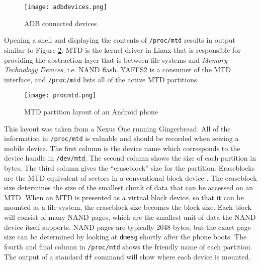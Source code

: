 \begin{figure}[htb]
\caption{ADB connected devices}
\begin{center}\texttt{[image: adbdevices.png]}\end{center}
\label{fig:adbdevices}
\end{figure}

Opening a shell and displaying the contents of \texttt{/proc/mtd} results in output similar to Figure \ref{fig:mtd}.  MTD is the
kernel driver in Linux that is responsible for providing the abstraction layer that is between file systems and \emph{Memory
Technology Devices}, i.e. NAND flash. YAFFS2 is a consumer of the MTD interface, and \texttt{/proc/mtd} lists all of the active MTD
partitions. 

\begin{figure}[htb]
\caption{MTD partition layout of an Android phone}
\begin{center}\texttt{[image: procmtd.png]}\end{center}
\label{fig:mtd}
\end{figure}	

This layout was taken from a Nexus One running Gingerbread.  All of the information in \texttt{/proc/mtd} is valuable and should be
recorded when seizing a mobile device. The first column is the device name which corresponds to the device handle in
\texttt{/dev/mtd}.  The second column shows the size of each partition in bytes. 
The third column gives the ``eraseblock'' size for the partition.  Eraseblocks are the MTD equivalent of sectors in a conventional block
device \cite{mtdfaq}. The eraseblock size determines the size of the smallest chunk of data that can be accessed on an MTD.  When an MTD
is presented as a virtual block device, so that it can be mounted as a file system, the eraseblock size becomes the block size.  Each
block will consist of many NAND pages, which are the smallest unit of data the NAND device itself supports.  NAND pages are
typically 2048 bytes, but the exact page size can be determined by looking at \texttt{dmesg} shortly after the phone boots.  The
fourth and final column in \texttt{/proc/mtd} shows the friendly name of each partition.  The output of a standard \texttt{df}
command will show where each device is mounted.

